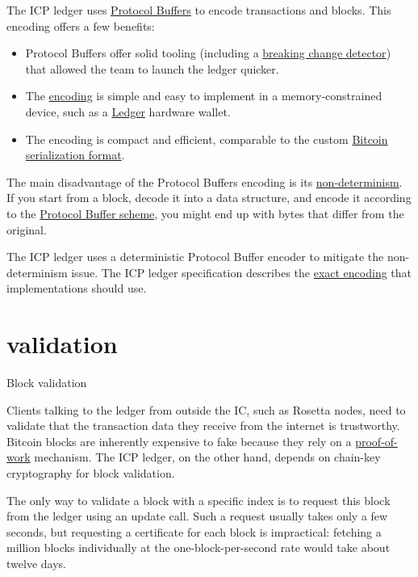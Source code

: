 \documentclass{article}
\begin{document}
The ICP ledger uses \href{https://developers.google.com/protocol-buffers}{Protocol Buffers} to encode transactions and blocks.
This encoding offers a few benefits:
\begin{itemize}
  \item
    Protocol Buffers offer solid tooling (including a \href{https://docs.buf.build/breaking/overview}{breaking change detector}) that allowed the team to launch the ledger quicker.
  \item
    The \href{https://developers.google.com/protocol-buffers/docs/encoding}{encoding} is simple and easy to implement in a memory-constrained device, such as a \href{https://www.ledger.com/}{Ledger} hardware wallet.
  \item
    The encoding is compact and efficient, comparable to the custom \href{https://developer.bitcoin.org/reference/transactions.html#raw-transaction-format}{Bitcoin serialization format}.
\end{itemize}

The main disadvantage of the Protocol Buffers encoding is its \href{https://developers.google.com/protocol-buffers/docs/encoding#implications}{non-determinism}.
If you start from a block, decode it into a data structure, and encode it according to the \href{https://github.com/dfinity/ic/blob/5248f11c18ca564881bbb82a4eb6915efb7ca62f/rs/rosetta-api/icp_ledger/proto/ic_ledger/pb/v1/types.proto}{Protocol Buffer scheme}, you might end up with bytes that differ from the original.

The ICP ledger uses a deterministic Protocol Buffer encoder to mitigate the non-determinism issue.
The ICP ledger specification describes the \href{https://internetcomputer.org/docs/current/references/ledger/#_chaining_ledger_blocks}{exact encoding} that implementations should use.

\section{validation}{Block validation}

Clients talking to the ledger from outside the IC, such as Rosetta nodes, need to validate that the transaction data they receive from the internet is trustworthy.
Bitcoin blocks are inherently expensive to fake because they rely on a \href{https://en.wikipedia.org/wiki/Proof_of_work}{proof-of-work} mechanism.
The ICP ledger, on the other hand, depends on chain-key cryptography for block validation.

The only way to validate a block with a specific index is to request this block from the ledger using an update call.
Such a request usually takes only a few seconds, but requesting a certificate for each block is impractical: fetching a million blocks individually at the one-block-per-second rate would take about twelve days.
\end{document}

